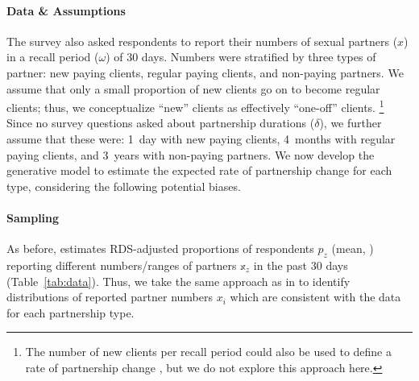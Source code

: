 \paragraph{Data \& Assumptions}
The survey \cite{Baral2014} also asked respondents to report
their numbers of sexual partners ($x$) in a recall period ($\omega$) of $30$ days.
Numbers were stratified by three types of partner:
new paying clients, regular paying clients, and non-paying partners.
We assume that
only a small proportion of new clients go on to become regular clients;
thus, we conceptualize ``new'' clients as effectively ``one-off'' clients.%
\footnote{The number of new clients per recall period
  could also be used to define a rate of partnership change \cite{Fazito2012},
  but we do not explore this approach here.}
Since no survey questions asked about partnership durations ($\delta$),
we further assume that these were:
1~day with new paying clients,
4~months with regular paying clients, and
3~years with non-paying partners.
We now develop the generative model to estimate
the expected rate of partnership change for each type,
considering the following potential biases.
\paragraph{Sampling}
As before, \cite{Baral2014} estimates RDS-adjusted proportions of respondents $p_z$ (mean, \ci)
reporting different numbers/ranges of partners $\mathbb{x}_z$ in the past 30 days
(Table~\ref{tab:data}).
Thus, we take the same approach as in 
to identify distributions of reported partner numbers $x_i$
which are consistent with the data for each partnership type.
